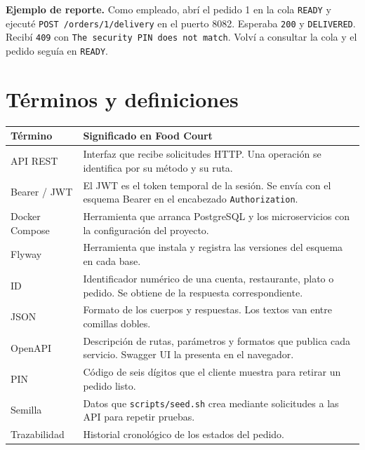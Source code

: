\documentclass[11pt,a4paper]{article}
\newcommand{\code}[1]{\nolinkurl{#1}}
\begin{document}
\textbf{Ejemplo de reporte.} Como empleado, abrí el pedido 1 en la cola \code{READY} y ejecuté \code{POST /orders/1/delivery} en el puerto 8082. Esperaba \code{200} y \code{DELIVERED}. Recibí \code{409} con \code{The security PIN does not match}. Volví a consultar la cola y el pedido seguía en \code{READY}.

\clearpage
\section{Términos y definiciones}\label{sec:glosario}
\begin{tabularx}{\linewidth}{@{}P{34mm}Y@{}}
\toprule
Término & Significado en Food Court \\
\midrule
API REST & Interfaz que recibe solicitudes HTTP. Una operación se identifica por su método y su ruta. \\
Bearer / JWT & El JWT es el token temporal de la sesión. Se envía con el esquema Bearer en el encabezado \code{Authorization}. \\
Docker Compose & Herramienta que arranca PostgreSQL y los microservicios con la configuración del proyecto. \\
Flyway & Herramienta que instala y registra las versiones del esquema en cada base. \\
ID & Identificador numérico de una cuenta, restaurante, plato o pedido. Se obtiene de la respuesta correspondiente. \\
JSON & Formato de los cuerpos y respuestas. Los textos van entre comillas dobles. \\
OpenAPI & Descripción de rutas, parámetros y formatos que publica cada servicio. Swagger UI la presenta en el navegador. \\
PIN & Código de seis dígitos que el cliente muestra para retirar un pedido listo. \\
Semilla & Datos que \code{scripts/seed.sh} crea mediante solicitudes a las API para repetir pruebas. \\
Trazabilidad & Historial cronológico de los estados del pedido. \\
\bottomrule
\end{tabularx}

\clearpage
\end{document}
